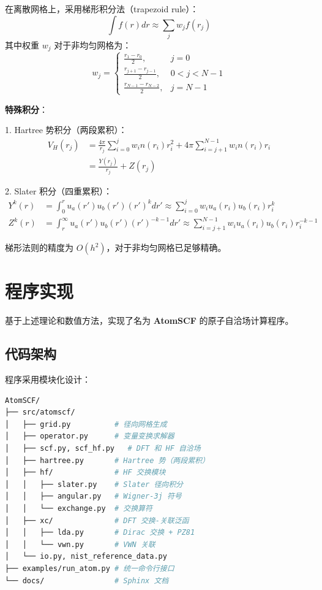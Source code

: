 \documentclass[12pt,a4paper]{article}
\begin{document}
在离散网格上，采用梯形积分法（trapezoid rule）：
\begin{equation}
    \int f(r) dr \approx \sum_j w_j f(r_j)
\end{equation}
其中权重 $w_j$ 对于非均匀网格为：
\begin{equation}
    w_j = \begin{cases}
        \frac{r_1 - r_0}{2},         & j = 0       \\
        \frac{r_{j+1} - r_{j-1}}{2}, & 0 < j < N-1 \\
        \frac{r_{N-1} - r_{N-2}}{2}, & j = N-1
    \end{cases}
\end{equation}

\textbf{特殊积分}：

1. Hartree 势积分（两段累积）：
\begin{align}
    V_H(r_j) & = \frac{4\pi}{r_j} \sum_{i=0}^{j} w_i n(r_i) r_i^2 + 4\pi \sum_{i=j+1}^{N-1} w_i n(r_i) r_i \\
             & = \frac{Y(r_j)}{r_j} + Z(r_j)
\end{align}

2. Slater 积分（四重累积）：
\begin{align}
    Y^k(r) & = \int_0^r u_a(r') u_b(r') (r')^k dr' \approx \sum_{i=0}^{j} w_i u_a(r_i) u_b(r_i) r_i^k                    \\
    Z^k(r) & = \int_r^\infty u_a(r') u_b(r') (r')^{-k-1} dr' \approx \sum_{i=j+1}^{N-1} w_i u_a(r_i) u_b(r_i) r_i^{-k-1}
\end{align}

梯形法则的精度为 $O(h^2)$，对于非均匀网格已足够精确。

\section{程序实现}

基于上述理论和数值方法，实现了名为 \textbf{AtomSCF} 的原子自洽场计算程序。

\subsection{代码架构}

程序采用模块化设计：

\begin{lstlisting}[language=bash, frame=none, numbers=none]
AtomSCF/
├── src/atomscf/
│   ├── grid.py          # 径向网格生成
│   ├── operator.py      # 变量变换求解器
│   ├── scf.py, scf_hf.py   # DFT 和 HF 自洽场
│   ├── hartree.py       # Hartree 势（两段累积）
│   ├── hf/              # HF 交换模块
│   │   ├── slater.py    # Slater 径向积分
│   │   ├── angular.py   # Wigner-3j 符号
│   │   └── exchange.py  # 交换算符
│   ├── xc/              # DFT 交换-关联泛函
│   │   ├── lda.py       # Dirac 交换 + PZ81
│   │   └── vwn.py       # VWN 关联
│   └── io.py, nist_reference_data.py
├── examples/run_atom.py # 统一命令行接口
└── docs/                # Sphinx 文档
\end{lstlisting}
\end{document}
